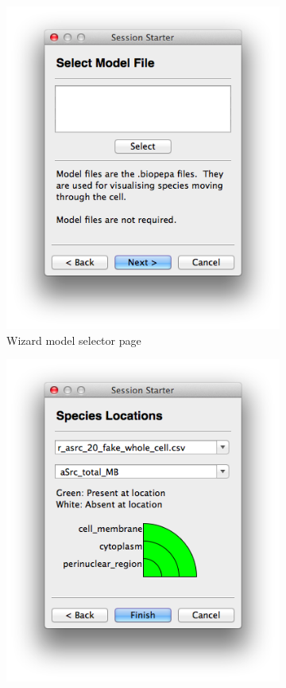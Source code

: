 \begin{figure}[h!]
    \begin{subfigure}[b]{0.24\textwidth}
        \centering
        \includegraphics[width=\textwidth]{images/wizard_page_3.png}
        \caption{Wizard model selector page}
        \label{fig:page_3}
    \end{subfigure}
    \begin{subfigure}[b]{0.24\textwidth}
        \centering
        \includegraphics[width=\textwidth]{images/wizard_page_4.png}

\end{subfigure}
\end{figure}
